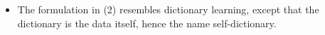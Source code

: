 \documentclass[10pt,xcolor={usenames,dvipsnames,table}]{beamer}
\def\blue{\color{blue}}
\newcommand{\citep}[1]{{\blue \scriptsize \parencite{#1}}}
\begin{document}
\begin{frame}
{\begin{itemize}
        \item The formulation in (2) resembles dictionary learning, except that the dictionary is the data itself, hence the name self-dictionary.
    \end{itemize}}
%
%


\end{frame}
\end{document}
